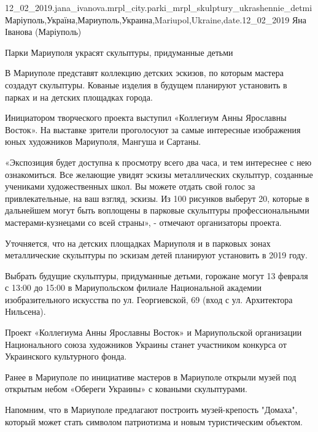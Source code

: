  
 
 
 
 

12_02_2019.jana_ivanova.mrpl_city.parki_mrpl_skulptury_ukrashennie_detmi
Маріуполь,Україна,Мариуполь,Украина,Mariupol,Ukraine,date.12_02_2019
Яна Іванова (Маріуполь)

Парки Мариуполя украсят скульптуры, придуманные детьми

В Мариуполе представят коллекцию детских эскизов, по которым мастера создадут
скульптуры. Кованые изделия в будущем планируют установить в парках и на
детских площадках города.

Инициатором творческого проекта выступил «Коллегиум Анны Ярославны Восток». На
выставке зрители проголосуют за самые интересные изображения юных художников
Мариуполя, Мангуша и Сартаны.

«Экспозиция будет доступна к просмотру всего два часа, и тем интереснее с нею
ознакомиться. Все желающие увидят эскизы металлических скульптур, созданные
учениками художественных школ. Вы можете отдать свой голос за привлекательные,
на ваш взгляд, эскизы. Из 100 рисунков выберут 20, которые в дальнейшем могут
быть воплощены в парковые скульптуры профессиональными мастерами-кузнецами со
всей страны», - отмечают организаторы проекта.

Уточняется, что на детских площадках Мариуполя и в парковых зонах металлические
скульптуры по эскизам детей планируют установить в 2019 году.

Выбрать будущие скульптуры, придуманные детьми, горожане могут 13 февраля с
13:00 до 15:00 в Мариупольском филиале Национальной академии изобразительного
искусства по ул. Георгиевской, 69 (вход с ул. Архитектора Нильсена).

Проект «Коллегиума Анны Ярославны Восток» и Мариупольской организации
Национального союза художников Украины станет участником конкурса от
Украинского культурного фонда.

Ранее в Мариуполе по инициативе мастеров в Мариуполе открыли музей под открытым
небом «Обереги Украины» с коваными скульптурами.

Напомним, что в Мариуполе предлагают построить музей-крепость "Домаха", который
может стать символом патриотизма и новым туристическим объектом.
